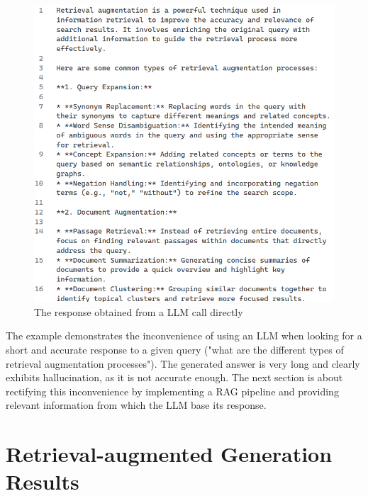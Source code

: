 \begin{figure}[H]
    \centering
    \includegraphics[width=\linewidth]{./figures/answer_norag.png}
    \caption{The response obtained from a LLM call directly}
\end{figure}
The example demonstrates the inconvenience of using an LLM when looking for a short and accurate response to a given query ("what are the different types of retrieval augmentation processes"). The generated answer is very long and clearly exhibits hallucination, as it is not accurate enough.\newline
The next section is about rectifying this inconvenience by implementing a RAG pipeline and providing relevant information from which the LLM base its response.

\section{Retrieval-augmented Generation Results}
